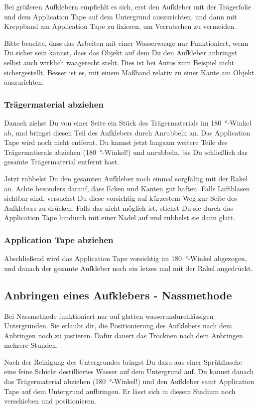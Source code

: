 \documentclass{\basedir/fablab-document}
\begin{document}
Bei größeren Aufklebern empfiehlt es sich, erst den Aufkleber mit der Trägerfolie und dem Application Tape auf dem Untergrund auszurichten, und dann mit Kreppband am Application Tape zu fixieren, um Verrutschen zu vermeiden.

Bitte beachte, dass das Arbeiten mit einer Wasserwaage nur Funktioniert, wenn Du sicher sein kannst, dass das Objekt auf dem Du den Aufkleber anbringst selbst auch wirklich waagerecht steht.
Dies ist bei Autos zum Beispiel nicht sichergestellt.
Besser ist es, mit einem Maßband relativ zu einer Kante am Objekt auszurichten.

\subsubsection{Trägermaterial abziehen}
Danach ziehst Du von einer Seite ein Stück des Trägermaterials im \SI{180}{\degree}-Winkel ab, und bringst diesen Teil des Aufklebers durch Anrubbeln an.
Das Application Tape wird noch nicht entfernt.
Du kannst jetzt langsam weitere Teile des Trägermatierals abziehen (\SI{180}{\degree}-Winkel!) und anrubbeln,
bis Du schließlich das gesamte Trägermaterial entfernt hast.

Jetzt rubbelst Du den gesamten Aufkleber noch einmal sorgfältig mit der Rakel an.
Achte besonders darauf, dass Ecken und Kanten gut haften.
Falls Luftblasen sichtbar sind, versuchst Du diese vorsichtig auf kürzestem Weg zur Seite des Aufklebers zu drücken.
Falls das nicht möglich ist, stichst Du sie durch das Application Tape hindurch mit einer Nadel auf und rubbelst sie dann glatt.

\subsubsection{Application Tape abziehen}
Abschließend wird das Application Tape vorsichtig im \SI{180}{\degree}-Winkel abgezogen, und danach der gesamte Aufkleber noch ein letzes mal mit der Rakel angedrückt.

\subsection{Anbringen eines Aufklebers - Nassmethode}
Bei Nassmethode funktioniert nur auf glatten wasserundurchlässigen Untergründen.
Sie erlaubt dir, die Positionierung des Aufklebers nach dem Anbringen noch zu justieren. Dafür dauert das Trocknen nach dem Anbringen mehrere Stunden.

Nach der Reinigung des Untergrundes bringst Du dazu aus einer Sprühflasche eine feine Schicht destilliertes Wasser auf dein Untergrund auf.
Du kannst danach das Trägermaterial abziehen (\SI{180}{\degree}-Winkel!) und den Aufkleber samt Application Tape auf dem Untergrund aufbringen.
Er lässt sich in diesem Stadium noch verschieben und positionieren.  
\end{document}

